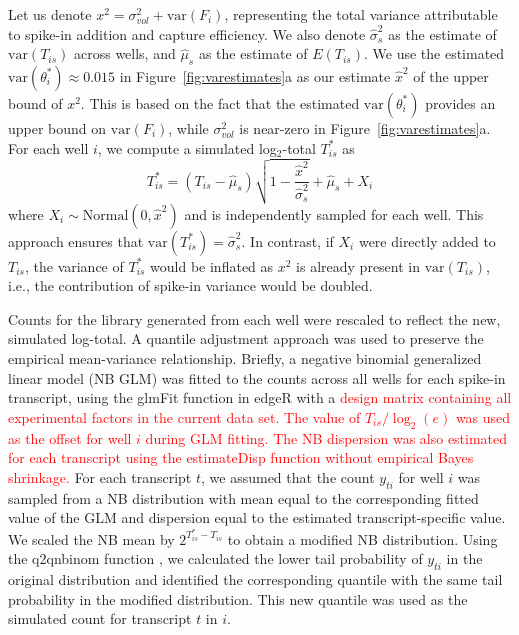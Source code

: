 \documentclass{article}
\newcommand{\revised}[1]{\textcolor{red}{#1}}
\newcommand\variance{\mbox{var}}
\begin{document}
Let us denote $x^2 = \sigma^2_{vol} + \variance(F_i)$, representing the total variance attributable to spike-in addition and capture efficiency.
We also denote $\hat\sigma^2_s$ as the estimate of $\variance(T_{is})$ across wells, and $\hat\mu_s$ as the estimate of $E(T_{is})$.
We use the estimated $\variance(\theta^*_i) \approx 0.015$ in Figure~\ref{fig:varestimates}a as our estimate $\hat{x}^2$ of the upper bound of $x^2$.
This is based on the fact that the estimated $\variance(\theta^*_i)$ provides an upper bound on $\variance(F_i)$, while $\sigma^2_{vol}$ is near-zero in Figure~\ref{fig:varestimates}a.
For each well $i$, we compute a simulated log$_2$-total $T^*_{is}$ as
\[
    T^*_{is} = (T_{is} - \hat\mu_s)\sqrt{1-\frac{ \hat{x}^2}{\hat\sigma^2_s}} + \hat\mu_s + X_i
\]
where $X_i \sim \mbox{Normal}(0, \hat{x}^2)$ and is independently sampled for each well.
This approach ensures that $\variance(T^*_{is}) = \hat\sigma^2_s$.
In contrast, if $X_i$ were directly added to $T_{is}$, the variance of $T^*_{is}$ would be inflated as $x^2$ is already present in $\variance(T_{is})$, i.e., the contribution of spike-in variance would be doubled.

Counts for the library generated from each well were rescaled to reflect the new, simulated log-total.
A quantile adjustment approach was used to preserve the empirical mean-variance relationship.
Briefly, a negative binomial generalized linear model (NB GLM) was fitted to the counts across all wells for each spike-in transcript, using the glmFit function in edgeR \autocite{mccarthy2012differential, robinson2010edgeR} with a \revised{design matrix containing all experimental factors in the current data set.
The value of $T_{is}/\log_2(e)$ was used as the offset for well $i$ during GLM fitting.
The NB dispersion was also estimated for each transcript using the estimateDisp function without empirical Bayes shrinkage.}
For each transcript $t$, we assumed that the count $y_{ti}$ for well $i$ was sampled from a NB distribution with mean equal to the corresponding fitted value of the GLM and dispersion equal to the estimated transcript-specific value.
We scaled the NB mean by $2^{T^*_{is} - T_{is}}$ to obtain a modified NB distribution.
Using the q2qnbinom function \autocite{robinson2008small}, we calculated the lower tail probability of $y_{ti}$ in the original distribution and identified the corresponding quantile with the same tail probability in the modified distribution.
This new quantile was used as the simulated count for transcript $t$ in $i$.
\end{document}
